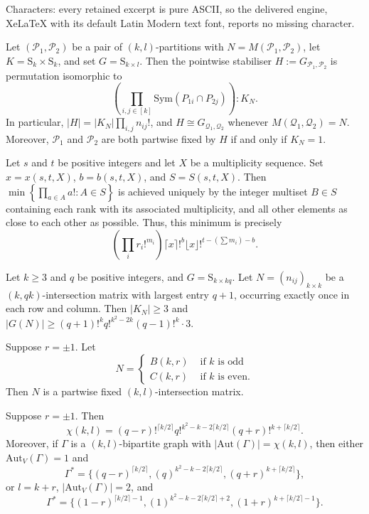 \documentclass[10pt,a4paper]{amsart}
\newcommand\Aut{\mathrm{Aut}}
\newcommand\Q{\mathcal{Q}}
\renewcommand\P{\mathcal{P}}
\renewcommand\S{\mathrm{S}}
\begin{document}
Characters: every retained excerpt is pure ASCII, so the delivered engine, XeLaTeX with its default Latin Modern text font, reports no missing character.
\begin{lemma}\label{top}
Let $(\mathcal{P}_1,\mathcal{P}_2)$ be a pair of $(k,l)$-partitions with $N=M(\P_1,\P_2)$, let $K=\S_{k}\times \S_{k}$, and set $G=\S_{k\times l}$. 
Then the pointwise stabiliser $H:=G_{\mathcal{P}_1,\mathcal{P}_2}$ is permutation isomorphic to $$\left(\prod_{i,j\in [k]}\mathrm{Sym}(P_{1i}\cap P_{2j})\right) :  K_{N}.$$ In particular, $|H|=|K_{N}|\prod_{i,j}n_{ij}!$, and $H\cong G_{\Q_1,\Q_2}$ whenever $M(\Q_1,\Q_2)=N$. Moreover, $\P_1$ and $\P_2$ are both partwise fixed by $H$ if and only if $K_N=1$.
\end{lemma}

\begin{lemma}\label{minN}
Let $s$ and $t$ be positive integers and let $X$ be a multiplicity sequence. Set $x=x(s,t,X)$, $b=b(s,t,X)$, and $S=S(s,t,X)$. Then $\min\left\{\prod_{a\in A} a! : A\in S\right\}$ is achieved uniquely by the integer multiset $B\in S$ containing each rank with its associated multiplicity, and all other elements as close to each other as possible. Thus, this minimum is precisely $$\left(\prod_{i}r_i!^{m_i}\right)\lceil x\rceil!^b\lfloor x\rfloor!^{t-\left(\sum m_i\right)-b}.$$ 
\end{lemma}

\begin{lemma}\label{centbound}
Let $k\geq3$ and $q$ be positive integers, and $G=\S_{k\times kq}$. Let $N=(n_{ij})_{k\times k}$ be a $(k,qk)$-intersection matrix with largest entry $q+1$, occurring exactly once in each row and column. Then $|K_N|\geq 3$ and  $|G(N)|\geq (q+1)!^kq!^{k^2-2k}(q-1)!^k\cdot 3$.
\end{lemma}

\begin{lemma}\label{bestmat1}
Suppose $r=\pm 1$. Let $$N=\begin{cases} B(k,r)&\text{ if $k$ is odd}\\C(k,r)&\text{ if $k$ is even.}\end{cases}$$ Then $N$ is a partwise fixed $(k,l)$-intersection matrix.
\end{lemma}

\begin{proposition}\label{1}
Suppose $r=\pm1$. Then $$\chi(k,l)=(q-r)!^{\lceil k/2\rceil}q!^{k^2-k-2\lceil k/2\rceil}(q+r)!^{k+\lceil k/2\rceil}.$$ Moreover, if $\Gamma$ is a $(k,l)$-bipartite graph with $|\Aut(\Gamma)|=\chi(k,l)$, then either $\Aut_V(\Gamma)=1$ and $$\Gamma^*=\{(q-r)^{\lceil k/2\rceil},(q)^{k^2-k-2\lceil k/2\rceil},(q+r)^{k+\lceil k/2\rceil}\},$$ or $l=k+r$, $|\Aut_V(\Gamma)|=2$, and $$\Gamma^*=\{(1-r)^{\lceil k/2\rceil-1},(1)^{k^2-k-2\lceil k/2\rceil+2},(1+r)^{k+\lceil k/2\rceil-1}\}.$$
\end{proposition}
\end{document}
